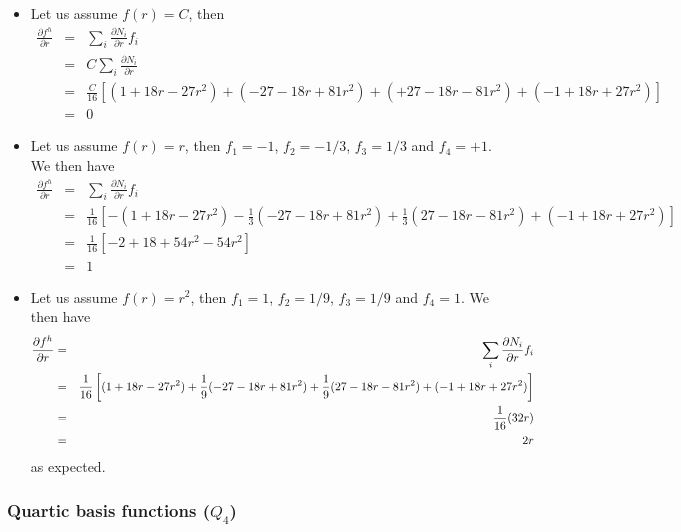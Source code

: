 \begin{itemize}
\item
Let us assume $f(r)=C$, then
\begin{eqnarray}
\frac{\partial f^h}{\partial r} 
&=& \sum_i \frac{\partial N_i}{\partial r} f_i  \nonumber\\
&=&  C \sum_i \frac{\partial N_i}{\partial r}  \nonumber\\
&=& \frac{C}{16} [  (  1 +18r - 27r^2 ) 
+ (-27 -18r + 81r^2 )  
+  (+27 -18r - 81r^2 ) 
+ ( -1 +18r + 27r^2 ) ]  \nonumber\\
&=& 0 \nonumber
\end{eqnarray}

\item
Let us assume $f(r)= r$, then $f_1=-1$, $f_2=-1/3$, $f_3=1/3$ and $f_4=+1$. We then have
\begin{eqnarray}
\frac{\partial f^h}{\partial r} 
&=& \sum_i \frac{\partial N_i}{\partial r} f_i  \nonumber\\
&=& \frac{1}{16} [  -(  1 +18r - 27r^2 ) 
 -\frac{1}{3} (-27 -18r + 81r^2 )  
 +\frac{1}{3} (27 -18r - 81r^2 )
 + ( -1 +18r + 27r^2 ) ]  \nonumber\\
&=& \frac{1}{16} [-2 + 18 + 54r^2 - 54r^2] \nonumber\\
&=& 1 \nonumber
\end{eqnarray}

\item
Let us assume $f(r)= r^2$, then $f_1=1$, $f_2=1/9$, $f_3=1/9$ and $f_4=1$. We then have
\begin{eqnarray}
\frac{\partial f^h}{\partial r} 
&=& \sum_i \frac{\partial N_i}{\partial r} f_i  \nonumber\\
&=& \frac{1}{16} \left[  
(  1 +18r - 27r^2 ) 
+\frac19 (-27 -18r + 81r^2 )  
+\frac19  (27 -18r - 81r^2 )
+ ( -1 +18r + 27r^2 ) \right]  \nonumber\\
&=& \frac{1}{16}(32r) \nonumber\\
&=& 2r
\end{eqnarray}
as expected.




\end{itemize}

\subsubsection{Quartic basis functions ($Q_4$) \label{sec:bf4}}


